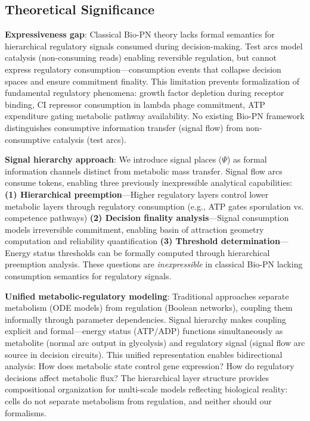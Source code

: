 
\subsection{Theoretical Significance}

\vspace{3pt}
\noindent\textbf{Expressiveness gap}: Classical Bio-PN theory lacks formal semantics for hierarchical regulatory signals consumed during decision-making. Test arcs model catalysis (non-consuming reads) enabling reversible regulation, but cannot express regulatory consumption---consumption events that collapse decision spaces and ensure commitment finality. This limitation prevents formalization of fundamental regulatory phenomena: growth factor depletion during receptor binding, CI repressor consumption in lambda phage commitment, ATP expenditure gating metabolic pathway availability. No existing Bio-PN framework distinguishes consumptive information transfer (signal flow) from non-consumptive catalysis (test arcs).

\vspace{3pt}
\noindent\textbf{Signal hierarchy approach}: We introduce signal places ($\Psi$) as formal information channels distinct from metabolic mass transfer. Signal flow arcs consume tokens, enabling three previously inexpressible analytical capabilities: \textbf{(1) Hierarchical preemption}---Higher regulatory layers control lower metabolic layers through regulatory consumption (e.g., ATP gates sporulation vs. competence pathways) \textbf{(2) Decision finality analysis}---Signal consumption models irreversible commitment, enabling basin of attraction geometry computation and reliability quantification \textbf{(3) Threshold determination}---Energy status thresholds can be formally computed through hierarchical preemption analysis. These questions are \textit{inexpressible} in classical Bio-PN lacking consumption semantics for regulatory signals.

\vspace{3pt}
\noindent\textbf{Unified metabolic-regulatory modeling}: Traditional approaches separate metabolism (ODE models) from regulation (Boolean networks), coupling them informally through parameter dependencies. Signal hierarchy makes coupling explicit and formal---energy status (ATP/ADP) functions simultaneously as metabolite (normal arc output in glycolysis) and regulatory signal (signal flow arc source in decision circuits). This unified representation enables bidirectional analysis: How does metabolic state control gene expression? How do regulatory decisions affect metabolic flux? The hierarchical layer structure provides compositional organization for multi-scale models reflecting biological reality: cells do not separate metabolism from regulation, and neither should our formalisms.

